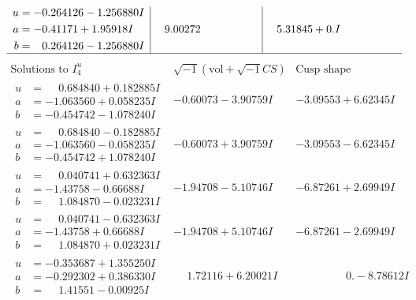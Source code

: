 \documentclass[1p]{elsarticle_modified}
\theoremstyle{definition}
\newcommand{\I}{\sqrt{-1}}
\begin{document}
$$\begin{array}{c|c|c}
\begin{aligned}
u &= -0.264126 - 1.256880 I \\
a &= -0.41171 + 1.95918 I \\
b &= \phantom{-}0.264126 - 1.256880 I\end{aligned}
 & \phantom{-}9.00272\phantom{ +0.000000I} & \phantom{-}5.31845 + 0. I\phantom{ +0.000000I}\\
 \hline 
 \end{array}$$\newpage$$\begin{array}{c|c|c}  
\text{Solutions to }I^u_{4}& \I (\text{vol} + \sqrt{-1}CS) & \text{Cusp shape}\\
 \hline 
\begin{aligned}
u &= \phantom{-}0.684840 + 0.182885 I \\
a &= -1.063560 + 0.058235 I \\
b &= -0.454742 - 1.078240 I\end{aligned}
 & -0.60073 - 3.90759 I & -3.09553 + 6.62345 I \\ \hline\begin{aligned}
u &= \phantom{-}0.684840 - 0.182885 I \\
a &= -1.063560 - 0.058235 I \\
b &= -0.454742 + 1.078240 I\end{aligned}
 & -0.60073 + 3.90759 I & -3.09553 - 6.62345 I \\ \hline\begin{aligned}
u &= \phantom{-}0.040741 + 0.632363 I \\
a &= -1.43758 - 0.66688 I \\
b &= \phantom{-}1.084870 - 0.023231 I\end{aligned}
 & -1.94708 - 5.10746 I & -6.87261 + 2.69949 I \\ \hline\begin{aligned}
u &= \phantom{-}0.040741 - 0.632363 I \\
a &= -1.43758 + 0.66688 I \\
b &= \phantom{-}1.084870 + 0.023231 I\end{aligned}
 & -1.94708 + 5.10746 I & -6.87261 - 2.69949 I \\ \hline\begin{aligned}
u &= -0.353687 + 1.355250 I \\
a &= -0.292302 + 0.386330 I \\
b &= \phantom{-}1.41551 - 0.00925 I\end{aligned}
 & \phantom{-}1.72116 + 6.20021 I & \phantom{-0.000000 } 0. - 8.78612 I \\ \hline\begin{aligned}

\end{aligned}
\end{array}$$
\end{document}
